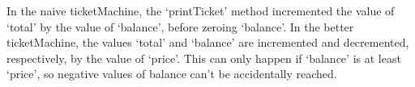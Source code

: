 In the naive ticketMachine, the `printTicket' method incremented the
value of `total' by the value of `balance', before zeroing `balance'. In
the better ticketMachine, the values `total' and `balance' are
incremented and decremented, respectively, by the value of `price'. This
can only happen if `balance' is at least `price', so negative values of
balance can't be accidentally reached.
